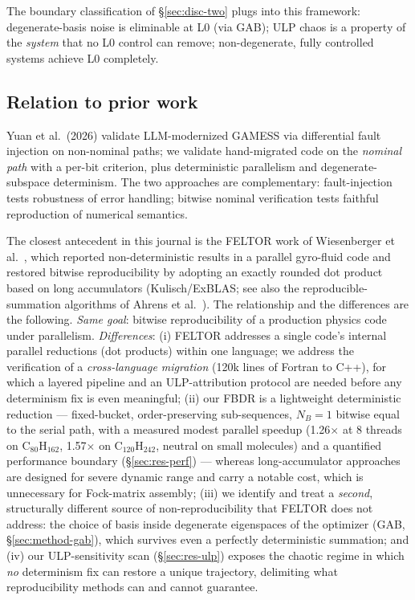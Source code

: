 \documentclass[preprint,12pt]{elsarticle}
\begin{document}
The boundary classification of \S\ref{sec:disc-two} plugs into this framework: degenerate-basis noise is eliminable at L0 (via GAB); ULP chaos is a property of the \emph{system} that no L0 control can remove; non-degenerate, fully controlled systems achieve L0 completely.

\subsection{Relation to prior work}\label{sec:disc-prior}

Yuan et al.\ (2026) validate LLM-modernized GAMESS via differential fault injection on non-nominal paths; we validate hand-migrated code on the \emph{nominal path} with a per-bit criterion, plus deterministic parallelism and degenerate-subspace determinism. The two approaches are complementary: fault-injection tests robustness of error handling; bitwise nominal verification tests faithful reproduction of numerical semantics.

The closest antecedent in this journal is the FELTOR work of Wiesenberger et al.\ \cite{feltor2019}, which reported non-deterministic results in a parallel gyro-fluid code and restored bitwise reproducibility by adopting an exactly rounded dot product based on long accumulators (Kulisch/ExBLAS; see also the reproducible-summation algorithms of Ahrens et al.\ \cite{ahrens2020}). The relationship and the differences are the following. \emph{Same goal}: bitwise reproducibility of a production physics code under parallelism. \emph{Differences}: (i) FELTOR addresses a single code's internal parallel reductions (dot products) within one language; we address the verification of a \emph{cross-language migration} (120k lines of Fortran to C++), for which a layered pipeline and an ULP-attribution protocol are needed before any determinism fix is even meaningful; (ii) our FBDR is a lightweight deterministic reduction --- fixed-bucket, order-preserving sub-sequences, $N_B=1$ bitwise equal to the serial path, with a measured modest parallel speedup (1.26$\times$ at 8 threads on C$_{80}$H$_{162}$, 1.57$\times$ on C$_{120}$H$_{242}$, neutral on small molecules) and a quantified performance boundary (\S\ref{sec:res-perf}) --- whereas long-accumulator approaches are designed for severe dynamic range and carry a notable cost, which is unnecessary for Fock-matrix assembly; (iii) we identify and treat a \emph{second}, structurally different source of non-reproducibility that FELTOR does not address: the choice of basis inside degenerate eigenspaces of the optimizer (GAB, \S\ref{sec:method-gab}), which survives even a perfectly deterministic summation; and (iv) our ULP-sensitivity scan (§\ref{sec:res-ulp}) exposes the chaotic regime in which \emph{no} determinism fix can restore a unique trajectory, delimiting what reproducibility methods can and cannot guarantee.
\end{document}

